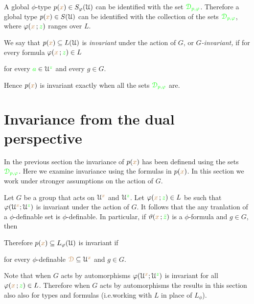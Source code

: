 A global $\phi$-type $p({\color{brown} x})\in S_\varphi(\EuScript U)$ can be identified with the set ${\color{green}\EuScript D_{p,\varphi}}$.
Therefore a global type $p({\color{brown} x})\in S(\EuScript U)$ can be identified with the collection of the sets ${\color{green}\EuScript D_{p,\varphi}}$, where $\varphi({\color{brown} x}\,;{\color{green} z})$ ranges over $L$.

We say that $p({\color{brown} x})\subseteq L(\EuScript U)$ is \emph{invariant\/} under the action of $G$, or \emph{$G$-invariant,} if for every formula $\varphi({\color{brown} x}\,;{\color{green} z})\in L$ 

\hfill for every ${\color{green} a}\in\EuScript U^{\color{green} z}$ and every $g\in G$.

Hence $p({\color{brown} x})$ is invariant exactly when all the sets $\color{green}\EuScript D_{p,\varphi}$ are.


\section{Invariance from the dual perspective}\label{dual_perspective}

In the previous section the invariance of $p({\color{brown} x})$ has been definend using the sets ${\color{green}\EuScript D_{p,\varphi}}$.
Here we examine invariance using the formulas in $p({\color{brown} x})$.
In this section we  work under stronger assumptions on the action of $G$.

Let $G$ be a group that acts on $\EuScript U^{\color{brown} x}$ and $\EuScript U^{\color{green} z}$.
Let $\varphi({\color{brown} x}\,;{\color{green} z})\in L$ be such that $\varphi(\EuScript U^{\color{brown} x};\EuScript U^{\color{green} z})$ is invariant under the action of $G$.
It follows that the any tranlation of a $\phi$-definable set is $\phi$-definable.
In particular, if $\vartheta({\color{brown} x}\,;{\color{green}\bar z})$ is a $\phi$-formula and $g\in G$, then 


Therefore $p({\color{brown} x})\subseteq L_\varphi(\EuScript U)$ is invariant if

\hfill for every $\phi$-definable ${\color{brown}\EuScript D}\subseteq\EuScript U^{\color{brown} x}$ and $g\in G$.

Note that when $G$ acts by automorphisms $\varphi(\EuScript U^{\color{brown} x};\EuScript U^{\color{green} z})$ is invariant for all $\varphi({\color{brown} x}\,;{\color{green} z})\in L$.
Therefore when $G$ acts by automorphisms the results in this section also also for types and formulas (i.e.\@ working with $L$ in place of $L_\phi$).

